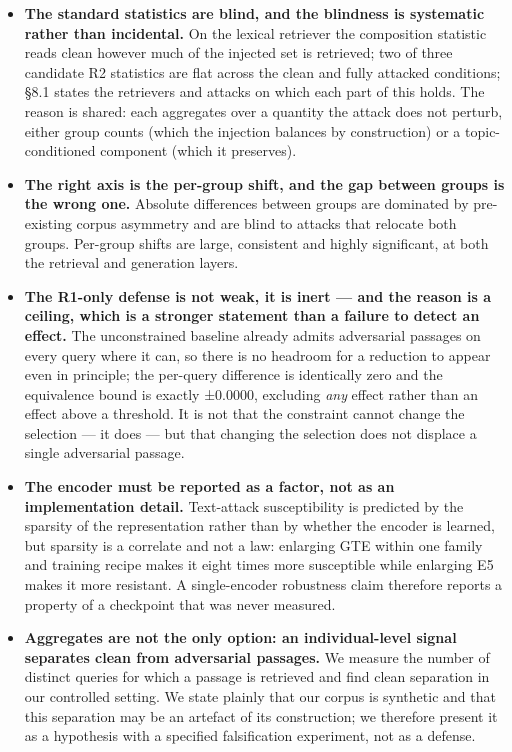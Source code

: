 \documentclass[authoryear,review,3p,times]{elsarticle}
\providecommand{\tightlist}{%
  \setlength{\itemsep}{0pt}\setlength{\parskip}{0pt}}
\begin{document}
\begin{itemize}
\tightlist
\item
  \textbf{The standard statistics are blind, and the blindness is systematic rather than incidental.} On the lexical retriever the composition statistic reads clean however much of the injected set is retrieved; two of three candidate R2 statistics are flat across the clean and fully attacked conditions; §8.1 states the retrievers and attacks on which each part of this holds. The reason is shared: each aggregates over a quantity the attack does not perturb, either group counts (which the injection balances by construction) or a topic-conditioned component (which it preserves).
\item
  \textbf{The right axis is the per-group shift, and the gap between groups is the wrong one.} Absolute differences between groups are dominated by pre-existing corpus asymmetry and are blind to attacks that relocate both groups. Per-group shifts are large, consistent and highly significant, at both the retrieval and generation layers.
\item
  \textbf{The R1-only defense is not weak, it is inert --- and the reason is a ceiling, which is a stronger statement than a failure to detect an effect.} The unconstrained baseline already admits adversarial passages on every query where it can, so there is no headroom for a reduction to appear even in principle; the per-query difference is identically zero and the equivalence bound is exactly ±0.0000, excluding \emph{any} effect rather than an effect above a threshold. It is not that the constraint cannot change the selection --- it does --- but that changing the selection does not displace a single adversarial passage.
\item
  \textbf{The encoder must be reported as a factor, not as an implementation detail.} Text-attack susceptibility is predicted by the sparsity of the representation rather than by whether the encoder is learned, but sparsity is a correlate and not a law: enlarging GTE within one family and training recipe makes it eight times more susceptible while enlarging E5 makes it more resistant. A single-encoder robustness claim therefore reports a property of a checkpoint that was never measured.
\item
  \textbf{Aggregates are not the only option: an individual-level signal separates clean from adversarial passages.} We measure the number of distinct queries for which a passage is retrieved and find clean separation in our controlled setting. We state plainly that our corpus is synthetic and that this separation may be an artefact of its construction; we therefore present it as a hypothesis with a specified falsification experiment, not as a defense.

\end{itemize}
\end{document}
